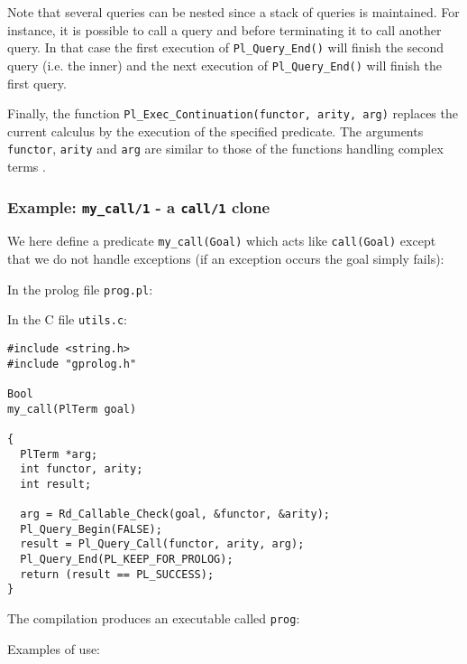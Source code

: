 Note that several queries can be nested since a stack of queries is
maintained. For instance, it is possible to call a query and before
terminating it to call another query. In that case the first execution of
\texttt{Pl\_Query\_End()} will finish the second query (i.e. the inner) and
the next execution of \texttt{Pl\_Query\_End()} will finish the first query.

Finally, the function \texttt{Pl\_Exec\_Continuation(functor, arity,
arg)} replaces the current calculus by the execution of the specified
predicate. The arguments \texttt{functor}, \texttt{arity} and
\texttt{arg} are similar to those of the functions handling complex
terms .

\subsubsection{Example: \texttt{my\_call/1} - a \texttt{call/1} clone}

We here define a predicate \texttt{my\_call(Goal)} which acts like
\texttt{call(Goal)} except that we do not handle exceptions (if an exception
occurs the goal simply fails):

In the prolog file \texttt{prog.pl}:


In the C file \texttt{utils.c}:

\begin{Indentation}
\begin{verbatim}
#include <string.h>
#include "gprolog.h"

Bool
my_call(PlTerm goal)

{
  PlTerm *arg;
  int functor, arity;
  int result;

  arg = Rd_Callable_Check(goal, &functor, &arity);
  Pl_Query_Begin(FALSE);
  result = Pl_Query_Call(functor, arity, arg);
  Pl_Query_End(PL_KEEP_FOR_PROLOG);
  return (result == PL_SUCCESS);
}
\end{verbatim}
\end{Indentation}

The compilation produces an executable called \texttt{prog}:


Examples of use:

\begin{CodeTwoCols}
\SkipLine
{}
\SkipLine
{}
\SkipLine
{}
\SkipLine
{}
\SkipLine
{}
\SkipLine
{}
\SkipLine
{}
\end{CodeTwoCols}

